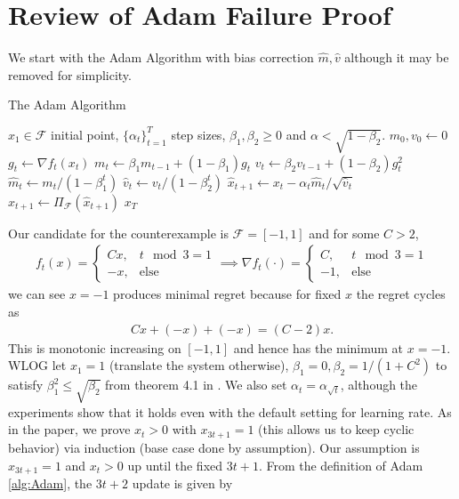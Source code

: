 \documentclass{article}
\newcommand{\1}{\mathbf{1}}                 %
\newcommand{\calF}{\mathcal{F}}
\begin{document}
\thispagestyle{fancy}
\fancyhf{}
\section*{Review of Adam Failure Proof}
We start with the Adam Algorithm with bias correction \(\hat{m},\hat{v}\) although it may be removed for simplicity. 
\begin{algorithm}
    \caption{The Adam Algorithm}\label{alg:Adam}
\begin{algorithmic}
    \Require \(x_1\in\calF\) initial point, \(\{\alpha_t\}_{t=1}^T\) step sizes, \(\beta_1,\beta_2\geq 0\) and \(\alpha<\sqrt{1-\beta_2}\).  
    \State $m_0,v_0  \gets 0$ 
        \State \(g_t\gets \nabla f_t(x_t)\) 
        \State \(m_t \gets \beta_1 m_{t-1} + (1-\beta_1)g_t \) 
        \State \(v_t \gets \beta_2 v_{t-1} + (1-\beta_2)g_t^2 \)
        \State \(\hat{m}_t \gets m_t/(1-\beta_1^t) \) 
        \State \(\hat{v}_t \gets v_t/(1-\beta_2^t)\) 
        \State \(\hat{x}_{t+1} \gets x_t - \alpha_t \hat{m}_t/\sqrt{\hat{v}_t }\)
        \State \(x_{t+1} \gets \Pi_\calF(\hat{x}_{t+1})\)
    \EndFor
    \State \Return \(x_T\)
    \end{algorithmic}
    \end{algorithm}
Our candidate for the counterexample is \(\calF=[-1,1]\) and for some \(C>2\), 
\begin{align*}
    f_t(x) = \begin{cases}
        Cx, & t\mod 3 = 1\\ 
        -x, & \text{else}
    \end{cases} \implies \nabla f_t(\cdot) = \begin{cases}
        C, & t\mod 3 = 1\\ 
        -1, & \text{else}
    \end{cases}
\end{align*}
we can see \(x=-1\) produces minimal regret because for fixed \(x\) the regret cycles as 
\begin{align*}
Cx + (-x) + (-x) = (C-2)x.
\end{align*}
This is monotonic increasing on \([-1,1]\) and hence has the minimum at \(x=-1\). WLOG let \(x_1 = 1\) (translate the system otherwise), \(\beta_1=0,\beta_2 = 1/(1+C^2)\) to satisfy \(\beta_1^2 \leq \sqrt{\beta_2}\) from theorem 4.1 in \cite{kingma2017adam}. We also set \(\alpha_t = \alpha_{\sqrt{t}}\), although the experiments show that it holds even with the default setting for learning rate. As in the paper, we prove \(x_t>0\) with \(x_{3t+1}=1\) (this allows us to keep cyclic behavior) via induction (base case done by assumption). Our assumption is \(x_{3t+1}=1\) and \(x_t>0\) up until the fixed \(3t+1\). From the definition of Adam \ref{alg:Adam}, the \(3t+2\) update is given by 
\end{document}
